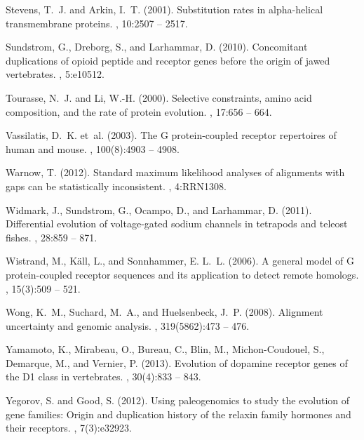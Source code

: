 \documentclass[fleqn,10pt]{wlpeerj}
\begin{document}
\begin{thebibliography}{}
Stevens, T.~J. and Arkin, I.~T. (2001).
\newblock Substitution rates in alpha-helical transmembrane proteins.
, 10:2507 -- 2517.

Sundstrom, G., Dreborg, S., and Larhammar, D. (2010).
\newblock Concomitant duplications of opioid peptide and receptor genes before
  the origin of jawed vertebrates.
, 5:e10512.

Tourasse, N.~J. and Li, W.-H. (2000).
\newblock Selective constraints, amino acid composition, and the rate of
  protein evolution.
, 17:656 -- 664.

Vassilatis, D.~K. et~al. (2003).
\newblock The {G} protein-coupled receptor repertoires of human and mouse.
, 100(8):4903 -- 4908.

Warnow, T. (2012).
\newblock Standard maximum likelihood analyses of alignments with gaps can be
  statistically inconsistent.
, 4:RRN1308.

Widmark, J., Sundstrom, G., Ocampo, D., and Larhammar, D. (2011).
\newblock Differential evolution of voltage-gated sodium channels in tetrapods
  and teleost fishes.
, 28:859 -- 871.

Wistrand, M., K{\"a}ll, L., and Sonnhammer, E. L.~L. (2006).
\newblock A general model of {G} protein-coupled receptor sequences and its
  application to detect remote homologs.
, 15(3):509 -- 521.

Wong, K.~M., Suchard, M.~A., and Huelsenbeck, J.~P. (2008).
\newblock Alignment uncertainty and genomic analysis.
, 319(5862):473 -- 476.

Yamamoto, K., Mirabeau, O., Bureau, C., Blin, M., Michon-Coudouel, S.,
  Demarque, M., and Vernier, P. (2013).
\newblock Evolution of dopamine receptor genes of the {D1} class in
  vertebrates.
, 30(4):833 -- 843.

Yegorov, S. and Good, S. (2012).
\newblock Using paleogenomics to study the evolution of gene families: Origin
  and duplication history of the relaxin family hormones and their receptors.
, 7(3):e32923.

\end{thebibliography}
\end{document}
